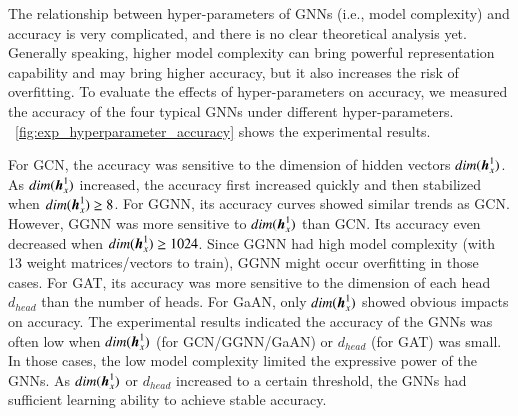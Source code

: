 The relationship between hyper-parameters of GNNs (i.e., model complexity) and accuracy is very complicated, and there is no clear theoretical analysis yet.
%
Generally speaking, higher model complexity can bring powerful representation capability and may bring higher accuracy, but it also increases the risk of overfitting.
%
To evaluate the effects of hyper-parameters on accuracy, we measured the accuracy of the four typical GNNs under different hyper-parameters.
%
\figurename~\ref{fig:exp_hyperparameter_accuracy} shows the experimental results.

For GCN, the accuracy was sensitive to the dimension of hidden vectors $dim(\boldsymbol{h}^1_x)$.
%
As $dim(\boldsymbol{h}^1_x)$ increased, the accuracy first increased quickly and then stabilized when $dim(\boldsymbol{h}_x^1) \geq 8$.
%
For GGNN, its accuracy curves showed similar trends as GCN.
%
However, GGNN was more sensitive to $dim(\boldsymbol{h}_x^1)$ than GCN.
%
Its accuracy even decreased when $dim(\boldsymbol{h}_x^1) \geq 1024$.
%
Since GGNN had high model complexity (with 13 weight matrices/vectors to train), GGNN might occur overfitting in those cases.
%
For GAT, its accuracy was more sensitive to the dimension of each head $d_{head}$ than the number of heads.
%
For GaAN, only $dim(\boldsymbol{h}_x^1)$ showed obvious impacts on accuracy.
%
The experimental results indicated the accuracy of the GNNs was often low when $dim(\boldsymbol{h}_x^1)$ (for GCN/GGNN/GaAN) or $d_{head}$ (for GAT) was small.
%
In those cases, the low model complexity limited the expressive power of the GNNs.
%
As $dim(\boldsymbol{h}_x^1)$ or $d_{head}$ increased to a certain threshold, the GNNs had sufficient learning ability to achieve stable accuracy.

